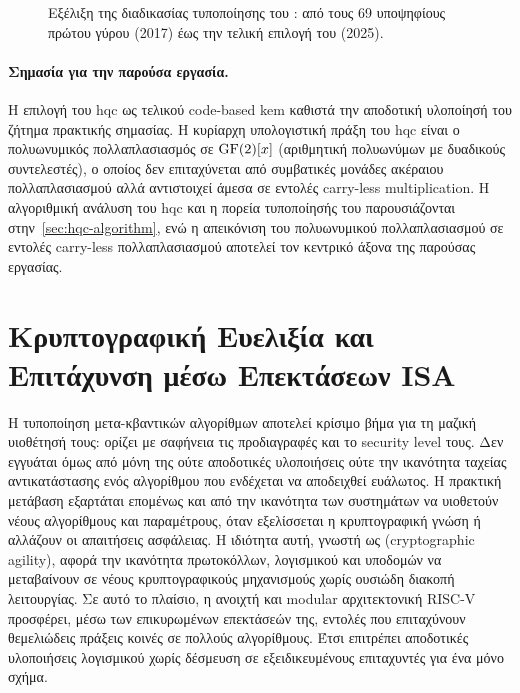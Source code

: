\begin{figure}[htbp]
  \centering
  
  \caption[Εξέλιξη της διαδικασίας τυποποίησης PQC του NIST]{Εξέλιξη της
    διαδικασίας τυποποίησης  του : από τους
    \num{69} υποψηφίους πρώτου γύρου (2017) έως την τελική επιλογή του \HQC
    (2025).}
  \label{fig:nist-rounds-flowchart}
\end{figure}

\paragraph{Σημασία για την παρούσα εργασία.}
Η επιλογή του \gls{hqc} ως τελικού code-based \gls{kem} καθιστά την αποδοτική
υλοποίησή του ζήτημα πρακτικής σημασίας. Η κυρίαρχη υπολογιστική πράξη του
\gls{hqc} είναι ο πολυωνυμικός πολλαπλασιασμός σε $\mathrm{GF}(2)[x]$ (αριθμητική
πολυωνύμων με δυαδικούς συντελεστές), ο οποίος δεν επιταχύνεται από συμβατικές
μονάδες ακέραιου πολλαπλασιασμού αλλά αντιστοιχεί άμεσα σε εντολές carry-less
multiplication. Η αλγοριθμική ανάλυση του \gls{hqc} και η πορεία τυποποίησής
του παρουσιάζονται στην~\cref{sec:hqc-algorithm}, ενώ η απεικόνιση του
πολυωνυμικού πολλαπλασιασμού σε εντολές carry-less πολλαπλασιασμού αποτελεί τον
κεντρικό άξονα της παρούσας εργασίας.

\section{Κρυπτογραφική Ευελιξία και Επιτάχυνση μέσω Επεκτάσεων ISA}
\label{sec:crypto-agility}

Η τυποποίηση μετα-κβαντικών αλγορίθμων αποτελεί κρίσιμο βήμα για τη μαζική
υιοθέτησή τους: ορίζει με σαφήνεια τις προδιαγραφές και το security level τους. 
Δεν εγγυάται όμως από μόνη της ούτε αποδοτικές υλοποιήσεις ούτε την ικανότητα ταχείας αντικατάστασης ενός αλγορίθμου
που ενδέχεται να αποδειχθεί ευάλωτος. Η πρακτική μετάβαση εξαρτάται επομένως και από
την ικανότητα των συστημάτων να υιοθετούν νέους αλγορίθμους και παραμέτρους, 
όταν εξελίσσεται η κρυπτογραφική γνώση ή αλλάζουν οι
απαιτήσεις ασφάλειας. Η ιδιότητα αυτή, γνωστή ως 
(cryptographic agility), αφορά την ικανότητα πρωτοκόλλων, λογισμικού και υποδομών
να μεταβαίνουν σε νέους κρυπτογραφικούς μηχανισμούς χωρίς ουσιώδη διακοπή λειτουργίας. 
Σε αυτό το πλαίσιο, η ανοιχτή και modular αρχιτεκτονική RISC-V προσφέρει, μέσω των 
επικυρωμένων επεκτάσεών της, εντολές που επιταχύνουν θεμελιώδεις πράξεις κοινές σε πολλούς 
αλγορίθμους. Έτσι επιτρέπει αποδοτικές υλοποιήσεις λογισμικού χωρίς δέσμευση σε εξειδικευμένους
επιταχυντές για ένα μόνο σχήμα.

